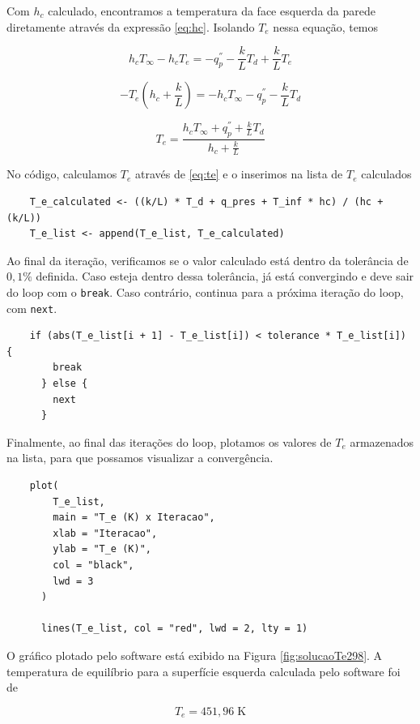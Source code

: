 \documentclass[12pt]{scrartcl}
\newcommand{\un}[1]{\;\textrm{#1}}
\newcommand{\code}[1]{\texttt{#1}}
\begin{document}
Com $h_c$ calculado, encontramos a temperatura da face esquerda da parede diretamente
através da expressão \eqref{eq:hc}. Isolando $T_e$ nessa equação, temos

\[ h_cT_{\infty} - h_cT_e = - q_{p}^{''} - \frac{k}{L}T_d + \frac{k}{L}T_e \]

\[  - T_e\left(h_c + \frac{k}{L}\right) = - h_cT_{\infty} - q_{p}^{''} - \frac{k}{L}T_d \]

\begin{equation}\label{eq:te}
    T_e = \frac{h_cT_{\infty} + q_{p}^{''} + \frac{k}{L}T_d}{h_c + \frac{k}{L}}
\end{equation}

No código, calculamos $T_e$ através de \eqref{eq:te} e o inserimos na lista de $T_e$ calculados

\begin{lstlisting}
    T_e_calculated <- ((k/L) * T_d + q_pres + T_inf * hc) / (hc + (k/L))
    T_e_list <- append(T_e_list, T_e_calculated)
\end{lstlisting}

Ao final da iteração, verificamos se o valor calculado está dentro da tolerância de $0,1\%$
definida. Caso esteja dentro dessa tolerância, já está convergindo e deve sair do loop com o
\code{break}. Caso contrário, continua para a próxima iteração do loop, com \code{next}.

\begin{lstlisting}
    if (abs(T_e_list[i + 1] - T_e_list[i]) < tolerance * T_e_list[i]) {
        break
      } else {
        next
      }
\end{lstlisting}

Finalmente, ao final das iterações do loop, plotamos os valores de $T_e$ armazenados na lista,
para que possamos visualizar a convergência.

\begin{lstlisting}
    plot(
        T_e_list,
        main = "T_e (K) x Iteracao",
        xlab = "Iteracao",
        ylab = "T_e (K)",
        col = "black",
        lwd = 3
      )
      
      lines(T_e_list, col = "red", lwd = 2, lty = 1)
\end{lstlisting}

O gráfico plotado pelo software está exibido na Figura \ref*{fig:solucaoTe298}.
A temperatura de equilíbrio para a superfície esquerda calculada pelo software foi de

\[ \boxed{T_e = 451,96 \un{K}} \]
\end{document}
